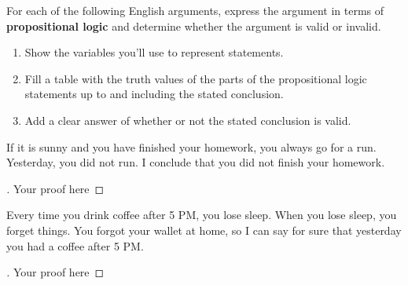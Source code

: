 \documentclass[12pt]{article}
\newenvironment{exercise}[2][Exercise]{\begin{trivlist}
\item[\hskip \labelsep {\bfseries #1}\hskip \labelsep {\bfseries #2.}]}{\end{trivlist}}
\newenvironment{solution}[1][{\color{red} Solution:}]{\begin{trivlist}
\item[\hskip \labelsep {\bfseries #1}\hskip \labelsep {\bfseries}]}{\end{trivlist}}
\begin{document}
 

\newcommand{\mainName}{Your Name Here} %

\newcommand{\collaborators}{
	Team: \textit{(Collaborator names here)}
}


\begin{exercise}{1}
For each of the following English arguments, express the argument in terms of \textbf{propositional logic} and determine whether the argument is valid or invalid.

\begin{tip}
\begin{enumerate}
    \item Show the variables you'll use to represent statements.
    \item Fill a table with the truth values of the parts of the propositional logic statements up to and including the stated conclusion.
    \item Add a clear answer of whether or not the stated conclusion is valid.
\end{enumerate}
\end{tip} 

\begin{enumerate}[(a)]

\item If it is sunny and you have finished your homework, you always go for a run. Yesterday, you did not run. I conclude that you did not finish your homework. 
    \begin{solution} 
        \begin{proof}[\unskip\nopunct]
            Your proof here
        \end{proof}

    
    \end{solution}


    \item Every time you drink coffee after 5 PM, you lose sleep. When you lose sleep, you forget things. You forgot your wallet at home, so I can say for sure that yesterday you had a coffee after 5 PM.
    
    \begin{solution} 
        \begin{proof}[\unskip\nopunct]
            Your proof here
        \end{proof}
    \end{solution}
    
\end{enumerate}
\end{exercise}
\end{document}
